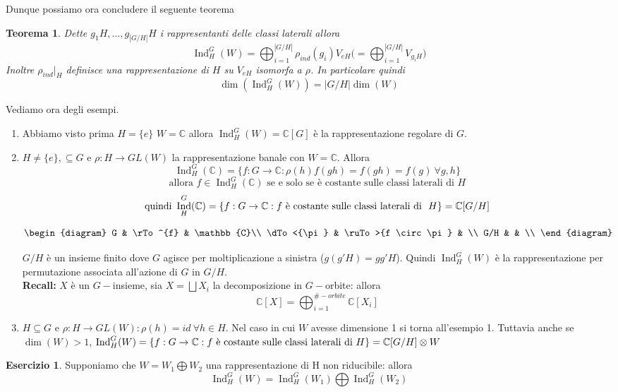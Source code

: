 \documentclass[11pt]{article}
\theoremstyle{plain}
\newtheorem{thm}{Teorema}[section]
\theoremstyle{definition}
\newtheorem{exercise}{Esercizio}[section]
\theoremstyle{remark}
\newcommand{\C}{\mathbb{C}}
\DeclareMathOperator{\Ind}{Ind}
\begin{document}
Dunque possiamo ora concludere il seguente teorema
\begin{thm} Dette $g_1H,...,g_{|G/H|}H$ i rappresentanti delle classi laterali allora
\[\Ind_H^G(W)=\bigoplus_{i=1}^{|G/H|}\rho_{ind}(g_i)V_{eH}\bigl( =\bigoplus_{i=1}^{|G/H|} V_{g_iH}\bigr) \]
Inoltre $\rho_{ind}|_H$ definisce una rappresentazione di $H$ su $V_{eH}$ isomorfa a $\rho$. In particolare quindi
\[\dim(\Ind_H^G(W))=|G/H|\dim(W)\]
\end{thm}
Vediamo ora degli esempi.
\begin{enumerate}
\item Abbiamo visto prima $H=\{e\}$ $W=\C$ allora $\Ind_H^G(W)=\C[G]$ è la rappresentazione regolare di $G$.
\item $H\neq \{e\},\subseteq G$ e $\rho:H\rightarrow GL(W)$ la rappresentazione banale con $W=\C$. Allora
\[\Ind_H^G(\C)=\{f:G\rightarrow \C:\rho(h)f(gh)=f(gh)=f(g)\ \forall g,h\} \]
\[\text{allora } f \in \Ind_H^G(\C)\text{ se e solo se è costante sulle classi laterali di } H\]
\[\text{quindi } \Ind_H^G(\C)=\{f:G\rightarrow \C:f \textup{ è costante sulle classi laterali di }\ H\}=\C[G/H]\]



\[
\begin{diagram}
G          & \rTo^{f}            & \C \\
\dTo<{\pi} & \ruTo>{f \circ \pi} &    \\
G/H        &                     &    \\
\end{diagram}
\]


$G/H$ è un insieme finito dove $G$ agisce per moltiplicazione a sinistra ($g(g'H)=gg'H$). Quindi $\Ind_H^G(W)$ è la rappresentazione per permutazione associata all'azione di $G$ in $G/H$. \\
\textbf{Recall:} $X$ è un $G-$insieme, sia $X= \bigsqcup X_i$ la decomposizione in $G-$orbite: allora
\[\C[X]=\bigoplus_{i=1}^{\#-orbite} \C[X_i]\]
\item $H\subseteq G$ e $\rho:H\rightarrow GL(W): \rho(h)=id\ \forall h\in H$. Nel caso in cui $W$ avesse dimensione 1 si torna all'esempio 1. Tuttavia anche se $\dim(W)>1$, $\Ind_H^G(W)=\{f:G\rightarrow \C:f \textup{ è costante sulle classi laterali di } H\}=\C[G/H]\otimes W$
\end{enumerate}
\begin{exercise} Supponiamo che $W=W_1\bigoplus W_2$ una rappresentazione di H non riducibile: allora
\[\Ind_H^G(W)=\Ind_H^G(W_1)\bigoplus \Ind_H^G(W_2)\]
\end{exercise}
\end{document}
